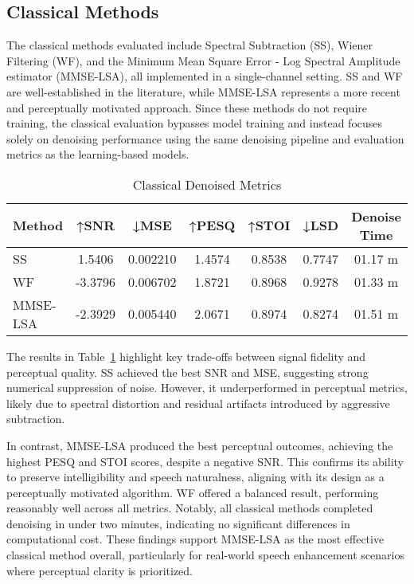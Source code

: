 \subsection{Classical Methods}
\label{sec:classical_methods}

The classical methods evaluated include Spectral Subtraction (SS), Wiener Filtering (WF), and the Minimum Mean Square Error - Log Spectral Amplitude estimator (MMSE-LSA), all implemented in a single-channel setting. SS and WF are well-established in the literature, while MMSE-LSA represents a more recent and perceptually motivated approach. Since these methods do not require training, the classical evaluation bypasses model training and instead focuses solely on denoising performance using the same denoising pipeline and evaluation metrics as the learning-based models.


\vspace{1em}
\begin{table}[H]
\centering
\caption{Classical Denoised Metrics}
\label{tab:classical_metrics}
\begin{tabular}{|l|c|c|c|c|c|c|}
\hline
\textbf{Method} & \textbf{↑SNR} & \textbf{↓MSE} & \textbf{↑PESQ} & \textbf{↑STOI} & \textbf{↓LSD} & \textbf{Denoise Time} \\
\hline
SS          & 1.5406 & 0.002210 & 1.4574 & 0.8538 & 0.7747 & 01.17 m \\
WF          & -3.3796 & 0.006702 & 1.8721 & 0.8968 & 0.9278 & 01.33 m \\
MMSE-LSA    & -2.3929 & 0.005440 & 2.0671 & 0.8974 & 0.8274 & 01.51 m \\
\hline
\end{tabular}
\end{table}


The results in Table~\ref{tab:classical_metrics} highlight key trade-offs between signal fidelity and perceptual quality. SS achieved the best SNR and MSE, suggesting strong numerical suppression of noise. However, it underperformed in perceptual metrics, likely due to spectral distortion and residual artifacts introduced by aggressive subtraction.

In contrast, MMSE-LSA produced the best perceptual outcomes, achieving the highest PESQ and STOI scores, despite a negative SNR. This confirms its ability to preserve intelligibility and speech naturalness, aligning with its design as a perceptually motivated algorithm. WF offered a balanced result, performing reasonably well across all metrics. Notably, all classical methods completed denoising in under two minutes, indicating no significant differences in computational cost. These findings support MMSE-LSA as the most effective classical method overall, particularly for real-world speech enhancement scenarios where perceptual clarity is prioritized.

